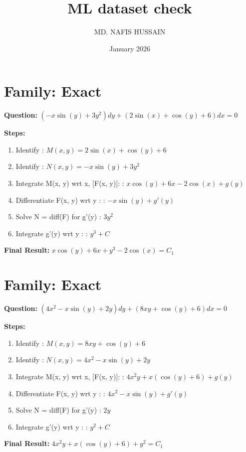\documentclass{article}
\title{ML dataset check}
\author{MD. NAFIS HUSSAIN}
\date{January 2026}
\begin{document}
\maketitle
\section*{Family: Exact}
\textbf{Question:} $\left(- x \sin{\left(y \right)} + 3 y^{2}\right) dy + \left(2 \sin{\left(x \right)} + \cos{\left(y \right)} + 6\right) dx = 0$

\textbf{Steps:}
\begin{enumerate}
\item Identify :  $M(x, y) = 2 \sin{\left(x \right)} + \cos{\left(y \right)} + 6$
\item Identify :  $N(x, y) = - x \sin{\left(y \right)} + 3 y^{2}$
\item Integrate M(x, y) wrt x, [F(x, y)]: :  $x \cos{\left(y \right)} + 6 x - 2 \cos{\left(x \right)} + g(y)$
\item Differentiate F(x, y) wrt y :  :  $- x \sin{\left(y \right)} + g'(y)$
\item Solve N = diff(F) for g'(y) :  $3 y^{2}$
\item Integrate g'(y) wrt y :  :  $y^{3} + C$
\end{enumerate}
\textbf{Final Result:} $x \cos{\left(y \right)} + 6 x + y^{3} - 2 \cos{\left(x \right)} = C_{1}$

\section*{Family: Exact}
\textbf{Question:} $\left(4 x^{2} - x \sin{\left(y \right)} + 2 y\right) dy + \left(8 x y + \cos{\left(y \right)} + 6\right) dx = 0$

\textbf{Steps:}
\begin{enumerate}
\item Identify :  $M(x, y) = 8 x y + \cos{\left(y \right)} + 6$
\item Identify :  $N(x, y) = 4 x^{2} - x \sin{\left(y \right)} + 2 y$
\item Integrate M(x, y) wrt x, [F(x, y)]: :  $4 x^{2} y + x \left(\cos{\left(y \right)} + 6\right) + g(y)$
\item Differentiate F(x, y) wrt y :  :  $4 x^{2} - x \sin{\left(y \right)} + g'(y)$
\item Solve N = diff(F) for g'(y) :  $2 y$
\item Integrate g'(y) wrt y :  :  $y^{2} + C$
\end{enumerate}
\textbf{Final Result:} $4 x^{2} y + x \left(\cos{\left(y \right)} + 6\right) + y^{2} = C_{1}$
\end{document}
